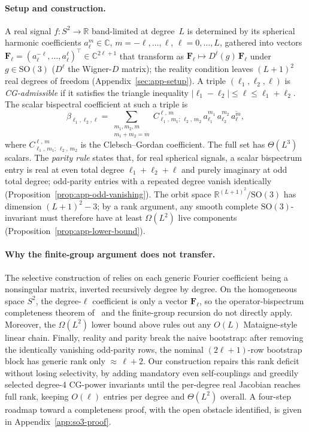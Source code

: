 \documentclass{article}
\theoremstyle{definition}
\theoremstyle{remark}
\newcommand{\R}{\mathbb{R}}
\newcommand{\C}{\mathbb{C}}
\newcommand{\SO}{\mathrm{SO}}
\newcommand{\CG}[6]{C^{#5,\,#6}_{#1,\,#2;\,#3,\,#4}}
\newcommand{\conj}[1]{\overline{#1}}
\theoremstyle{definition}
\begin{document}
\paragraph{Setup and construction.} A real signal $f : S^2 \to \R$
band-limited at degree~$L$ is determined by its spherical harmonic
coefficients $a_\ell^m\in\C$, $m=-\ell,\dots,\ell$, $\ell=0,\dots,L$,
gathered into vectors $\mathbf{F}_\ell = (a_\ell^{-\ell},\dots,
a_\ell^{\ell})^\top \in \C^{2\ell+1}$ that transform as
$\mathbf{F}_\ell \mapsto D^\ell(g)\,\mathbf{F}_\ell$ under
$g\in\SO(3)$ ($D^\ell$ the Wigner-$D$ matrix); the reality condition
leaves $(L{+}1)^2$ real degrees of freedom
(Appendix~\ref{sec:app-setup}).
A triple $(\ell_1,\ell_2,\ell)$ is \emph{CG-admissible} if it
satisfies the triangle inequality
$|\ell_1-\ell_2|\le\ell\le\ell_1+\ell_2$. The scalar bispectral
coefficient at such a triple is
\begin{equation}\label{eq:s6-bispectrum}
  \beta_{\ell_1,\ell_2,\ell}
  = \!\!\!\sum_{\substack{m_1,m_2,m\\ m_1+m_2=m}}\!\!\!
    \CG{\ell_1}{m_1}{\ell_2}{m_2}{\ell}{m}\,
    a_{\ell_1}^{m_1}\,a_{\ell_2}^{m_2}\,\conj{a_\ell^m},
\end{equation}
where $\CG{\ell_1}{m_1}{\ell_2}{m_2}{\ell}{m}$ is the Clebsch--Gordan
coefficient. The full set has $\Theta(L^3)$ scalars.
The \emph{parity rule} states that, for real spherical signals, a
scalar bispectrum entry is real at even total degree
$\ell_1{+}\ell_2{+}\ell$ and purely imaginary at odd total degree;
odd-parity entries with a repeated degree vanish identically
(Proposition~\ref{prop:app-odd-vanishing}). The orbit space
$\R^{(L+1)^2}/\SO(3)$ has dimension $(L{+}1)^2 - 3$; by a rank
argument, any smooth complete $\SO(3)$-invariant must therefore have
at least $\Omega(L^2)$ live components
(Proposition~\ref{prop:app-lower-bound}). 

\paragraph{Why the finite-group argument does not transfer.}
The selective construction of \citet{mataigne2024selective} relies on
each generic Fourier coefficient being a nonsingular matrix, inverted
recursively degree by degree. On the homogeneous space $S^2$, the
degree-$\ell$ coefficient is only a vector $\mathbf{F}_\ell$, so the
operator-bispectrum completeness theorem
of~\citet{kakarala2012bispectrum} and the finite-group recursion do
not directly apply. Moreover, the $\Omega(L^2)$ lower bound above
rules out any $O(L)$ Mataigne-style linear chain. Finally, reality
and parity break the naive bootstrap: after removing the identically
vanishing odd-parity rows, the nominal $(2\ell{+}1)$-row bootstrap
block has generic rank only ${\approx}\,\ell{+}2$. Our construction
repairs this rank deficit without losing selectivity, by adding
mandatory even self-couplings and greedily selected degree-4 CG-power
invariants until the per-degree real Jacobian reaches full rank,
keeping $O(\ell)$ entries per degree and $\Theta(L^2)$ overall. A
four-step roadmap toward a completeness proof, with the open obstacle
identified, is given in Appendix~\ref{app:so3-proof}.
\end{document}
